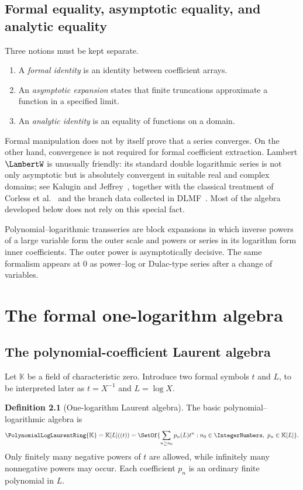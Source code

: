 \documentclass[11pt,oneside]{book}
\theoremstyle{definition}
\newtheorem{definition}[theorem]{Definition}
\theoremstyle{remark}
\newcommand{\K}{\mathbb K}
\newcommand{\PLpoly}{\PolynomialLogLaurentRing{\K}}
\begin{document}
\section{Formal equality, asymptotic equality, and analytic equality}
Three notions must be kept separate.
\begin{enumerate}
\item A \emph{formal identity} is an identity between coefficient arrays.
\item An \emph{asymptotic expansion} states that finite truncations approximate
      a function in a specified limit.
\item An \emph{analytic identity} is an equality of functions on a domain.
\end{enumerate}
Formal manipulation does not by itself prove that a series converges.  On the
other hand, convergence is not required for formal coefficient extraction.
Lambert $\LambertW$ is unusually friendly: its standard double logarithmic series is
not only asymptotic but is absolutely convergent in suitable real and complex
domains; see Kalugin and Jeffrey~\cite{KaluginJeffrey2012}, together with the
classical treatment of Corless et al.~\cite{Corless1996} and the branch data
collected in DLMF~\cite{DLMF413}.
Most of the algebra developed below does not rely on this special fact.

\begin{summarybox}
Polynomial--logarithmic transseries are block expansions in which inverse
powers of a large variable form the outer scale and powers or series in its
logarithm form inner coefficients.  The outer power is asymptotically decisive.
The same formalism appears at $0$ as power--log or Dulac-type series after a
change of variables.
\end{summarybox}

\chapter{The formal one-logarithm algebra}
\label{ch:formal-ring}

\section{The polynomial-coefficient Laurent algebra}
Let $\K$ be a field of characteristic zero.  Introduce two formal symbols
$t$ and $L$, to be interpreted later as $t=X^{-1}$ and $L=\log X$.

\begin{definition}[One-logarithm Laurent algebra]
The basic polynomial--logarithmic algebra is
\begin{equation}\label{eq:PL-poly-def}
 \PLpoly=\K[L]((t))
 =\SetOf{\sum_{n\ge n_0}p_n(L)t^n:
 n_0\in\IntegerNumbers,\ p_n\in\K[L]}.
\end{equation}
Only finitely many negative powers of $t$ are allowed, while infinitely many
nonnegative powers may occur.  Each coefficient $p_n$ is an ordinary finite
polynomial in $L$.
\end{definition}
\end{document}
